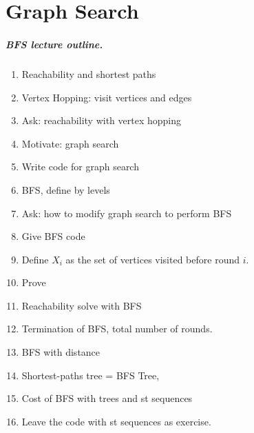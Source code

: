 \chapter{Graph Search}
\label{ch:graph-search}



\begin{notesonly}
\paragraph{BFS lecture outline.}
\begin{enumerate}
\item Reachability and shortest paths
\item Vertex Hopping: visit vertices and edges
\item Ask: reachability with vertex hopping
\item Motivate: graph search
\item Write code for graph search
\item BFS, define by levels 
\item Ask: how to modify graph search to perform BFS
\item Give BFS code
\item Define $X_i$ as the set of vertices visited before round $i$.
\item Prove 
\item Reachability solve with BFS
\item Termination of BFS, total number of rounds.
\item BFS with distance
\item Shortest-paths tree = BFS Tree, 
\item Cost of BFS with trees and st sequences
\item Leave the code with st sequences as exercise.
\end{enumerate}



\end{notesonly}
